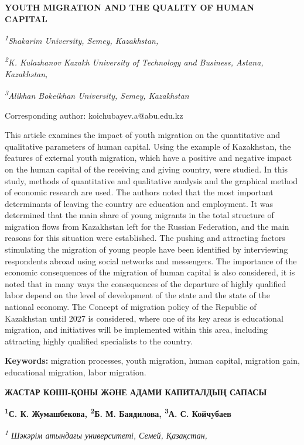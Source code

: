 
{\bfseries YOUTH MIGRATION AND THE QUALITY OF HUMAN CAPITAL}


\emph{\textsuperscript{1}Shakarim University, Semey, Kazakhstan,}

\emph{\textsuperscript{2}K. Kulazhanov Kazakh University of Technology
and Business, Astana, Kazakhstan,}

\emph{\textsuperscript{3}Alikhan Bokeikhan University, Semey,
Kazakhstan}

\textsuperscript{\envelope }Corresponding author: koichubayev.a@abu.edu.kz

This article examines the impact of youth migration on the quantitative
and qualitative parameters of human capital. Using the example of
Kazakhstan, the features of external youth migration, which have a
positive and negative impact on the human capital of the receiving and
giving country, were studied. In this study, methods of quantitative and
qualitative analysis and the graphical method of economic research are
used. The authors noted that the most important determinants of leaving
the country are education and employment. It was determined that the
main share of young migrants in the total structure of migration flows
from Kazakhstan left for the Russian Federation, and the main reasons
for this situation were established. The pushing and attracting factors
stimulating the migration of young people have been identified by
interviewing respondents abroad using social networks and messengers.
The importance of the economic consequences of the migration of human
capital is also considered, it is noted that in many ways the
consequences of the departure of highly qualified labor depend on the
level of development of the state and the state of the national economy.
The Concept of migration policy of the Republic of Kazakhstan until 2027
is considered, where one of its key areas is educational migration, and
initiatives will be implemented within this area, including attracting
highly qualified specialists to the country.

{\bfseries Keywords:} migration processes, youth migration, human capital,
migration gain, educational migration, labor migration.

{\bfseries ЖАСТАР КӨШІ-ҚОНЫ ЖӘНЕ АДАМИ КАПИТАЛДЫҢ САПАСЫ}

{\bfseries \textsuperscript{1}С. К. Жумашбекова, \textsuperscript{2}Б. М.
Баядилова, \textsuperscript{3}А. С. Койчубаев\textsuperscript{\envelope }}

\emph{\textsuperscript{1} Шәкәрім атындағы университеті, Семей,
Қазақстан}\emph{,}

